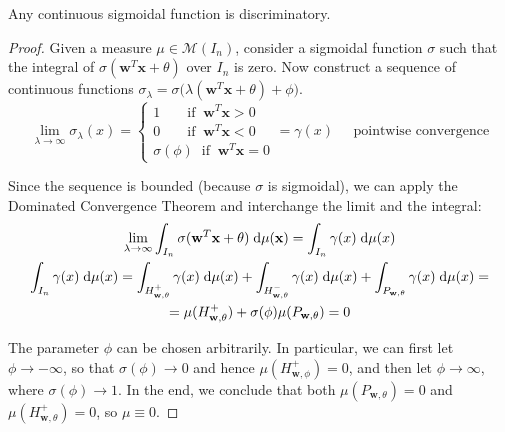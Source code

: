 \documentclass{article}
\numberwithin{equation}{subsection}
\begin{document}
\begin{theorem}
    Any continuous sigmoidal function is discriminatory.
\end{theorem}
\begin{proof}
    Given a measure $\mu \in \mathcal{M}(I_n)$, consider a sigmoidal function $\sigma$ such that the integral of $\sigma(\textbf{w}^T\textbf{x}+\theta)$ over $I_n$ is zero. Now construct a sequence of continuous functions $\sigma_{\lambda} = \sigma\big(\lambda(\textbf{w}^T\textbf{x}+\theta)+\phi\big)$.
    \begin{equation*}
        \lim_{\lambda \to \infty} \sigma_{\lambda}(x) = \begin{cases}
            1 \;\;\;\;\;\;\; \text{if} \;\; \textbf{w}^T \textbf{x} > 0 \\
            0 \;\;\;\;\;\;\; \text{if} \;\; \textbf{w}^T \textbf{x} < 0 \\
            \sigma(\phi) \;\; \text{if} \;\; \textbf{w}^T \textbf{x} = 0
        \end{cases}
        = \gamma(x) \;\;\;\;\; \text{pointwise convergence}
    \end{equation*}

    Since the sequence is bounded (because $\sigma$ is sigmoidal), we can apply the Dominated Convergence Theorem and interchange the limit and the integral:
    \begin{gather*}
        \lim_{\lambda \to \infty} \int_{I_n} \sigma(\textbf{w}^T\textbf{x}+\theta) \;\text{d} \mu(\textbf{x}) = \int_{I_n} \gamma(x) \;\text{d} \mu(x) \\
        \int_{I_n} \gamma(x) \;\text{d} \mu(x) = \int_{H^+_{\textbf{w}, \theta}} \gamma(x) \;\text{d} \mu(x) + \int_{H^-_{\textbf{w},\theta}} \gamma(x) \;\text{d} \mu(x) + \int_{P_{\textbf{w},\theta}} \gamma(x) \;\text{d} \mu(x) = \\
        = \mu(H^+_{\textbf{w},\theta}) + \sigma(\phi) \mu(P_{\textbf{w},\theta}) = 0
    \end{gather*}

    The parameter $\phi$ can be chosen arbitrarily. In particular, we can first let $\phi \to -\infty$, so that $\sigma(\phi) \to 0$ and hence $\mu(H^+_{\textbf{w},\phi}) = 0$, and then let $\phi \to \infty$, where $\sigma(\phi) \to 1$. In the end, we conclude that both $\mu(P_{\textbf{w},\theta}) = 0$ and $\mu(H^+_{\textbf{w},\theta}) = 0$, so $\mu \equiv 0$.
\end{proof}
\end{document}
